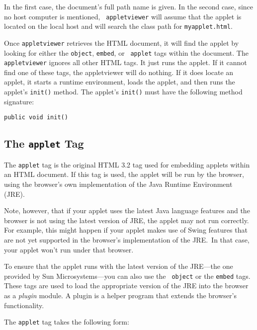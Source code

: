 \noindent In the first case, the document's full path name is
given.  In the second case, since no host computer is mentioned, {\tt
appletviewer} will assume that the applet is located on the local host
and will search the class path for {\tt myapplet.html}.

Once {\tt appletviewer} retrieves the HTML document, it will find the
applet by looking for either the {\tt object}, {\tt embed}, or {\tt
applet} tags within the document.  The {\tt appletviewer} ignores all
other HTML tags.   It just runs the applet.  If it cannot find one of
these tags, the appletviewer will do nothing.   If it does locate an
applet, it starts a runtime environment, loads the applet, and then
runs the applet's {\tt init()} method.  The applet's {\tt init()} must
have the following method signature:

\begin{jjjlisting}
\begin{lstlisting}
public void init()
\end{lstlisting}
\end{jjjlisting}

\subsection*{The {\tt applet} Tag}
\noindent 
The {\tt applet} tag is the original HTML 3.2 tag used for embedding
applets within an HTML document.  If this tag is used, the applet will
be run by the browser, using the browser's own implementation of the
Java Runtime Environment (JRE).

\spstrict Note, however, that if your applet uses the latest Java language
features and the browser is not using the latest version of JRE, the
applet may not run correctly.  For example, this might happen if your
applet makes use of Swing features that are not yet supported in the
browser's implementation of the JRE.~In that case, your applet won't
run under that browser.\spnormalstr


To ensure that the applet runs with the latest version of the JRE---the 
one provided by Sun Microsystems---you can also use the {\tt
object} or the {\tt embed} tags.  These tags are used to load the
appropriate version of the JRE into the browser as a {\it plugin}
module.   A plugin is a helper program that extends the browser's
functionality.

The {\tt applet} tag takes the following form:

